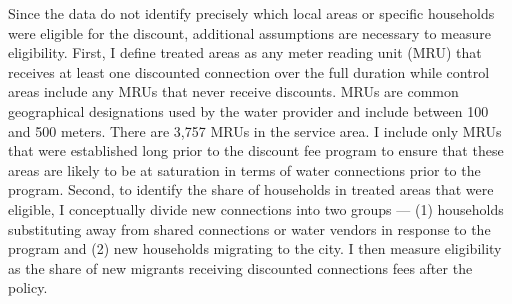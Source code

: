 \documentclass[12pt]{article}
\begin{document}
\begin{appendices}
Since the data do not identify precisely which local areas or specific households were eligible for the discount, additional assumptions are necessary to measure eligibility.  First, I define treated areas as any meter reading unit (MRU) that receives at least one discounted connection over the full duration while control areas include any MRUs that never receive discounts.  MRUs are common geographical designations used by the water provider and include between 100 and 500 meters.  There are 3,757 MRUs in the service area.  I include only MRUs that were established long prior to the discount fee program to ensure that these areas are likely to be at saturation in terms of water connections prior to the program.  Second, to identify the share of households in treated areas that were eligible, I conceptually divide new connections into two groups --- (1) households substituting away from shared connections or water vendors in response to the program and (2) new households migrating to the city.  I then measure eligibility as the share of new migrants receiving discounted connections fees after the policy.


\end{appendices}
\end{document}
